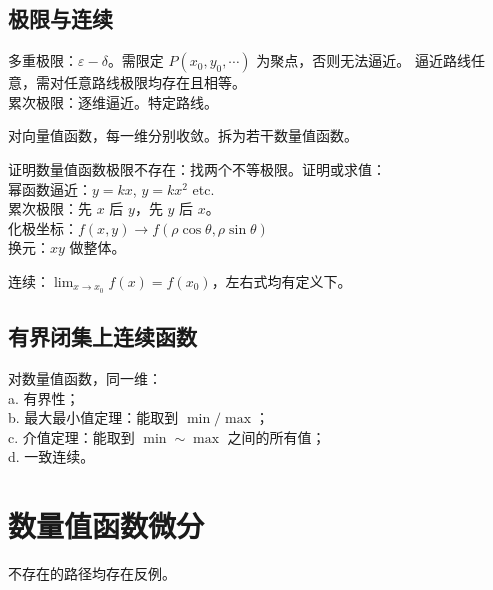 \documentclass[12pt, a4paper, UTF8, openany]{ctexbook}
\begin{document}
        \subsection{极限与连续}
        多重极限：$\varepsilon-\delta$。需限定 $P(x_0, y_0, \cdots)$ 为聚点，否则无法逼近。
        {\heiti 逼近路线任意}，需对任意路线极限均存在且相等。\\
        累次极限：逐维逼近。特定路线。

        对向量值函数，每一维分别收敛。拆为若干数量值函数。

        证明数量值函数极限不存在：找两个不等极限。证明或求值：\\
        幂函数逼近：$y = kx$, $y = kx^2$ etc. \\
        累次极限：先 $x$ 后 $y$，先 $y$ 后 $x$。\\
        化极坐标：$f(x, y) \to f(\rho\cos\theta, \rho\sin\theta)$ \\
        换元：$xy$ 做整体。

        连续：$\lim_{x \to x_0} f(x) = f(x_0)$，左右式均有定义下。

        \subsection{有界闭集上连续函数}
        对数量值函数，同一维：\\
        a. 有界性；\\
        b. 最大最小值定理：能取到 $\min / \max$；\\
        c. 介值定理：能取到 $\min \sim \max$ 之间的所有值；\\
        d. 一致连续。

    \section{数量值函数微分}
        不存在的路径均存在反例。

\end{document}
